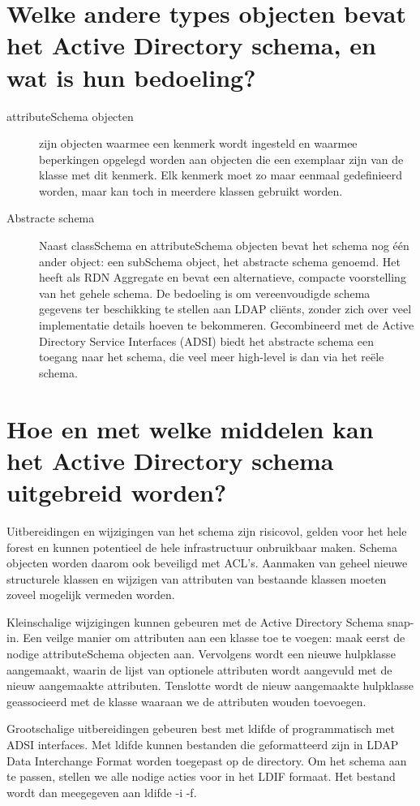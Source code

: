 \section{Welke andere types objecten bevat het Active Directory schema, en wat
is hun bedoeling?}

\begin{description}
	\item[attributeSchema objecten] zijn objecten waarmee een kenmerk wordt
		ingesteld en waarmee beperkingen opgelegd worden aan objecten
		die een exemplaar zijn van de klasse met dit kenmerk. Elk
		kenmerk moet zo maar eenmaal gedefinieerd worden, maar kan toch
		in meerdere klassen gebruikt worden.
	\item[Abstracte schema] Naast classSchema en attributeSchema
		objecten bevat het schema nog één ander object: een subSchema
		object, het abstracte schema genoemd. Het heeft als RDN
		Aggregate en bevat een alternatieve, compacte voorstelling van
		het gehele schema. De bedoeling is om vereenvoudigde schema
		gegevens ter beschikking te stellen aan LDAP cliënts, zonder
		zich over veel implementatie details hoeven te bekommeren.
		Gecombineerd met de Active Directory Service Interfaces (ADSI)
		biedt het abstracte schema een toegang naar het schema, die veel
		meer high-level is dan via het reële schema.
\end{description}

\section{Hoe en met welke middelen kan het Active Directory schema uitgebreid
worden?}

Uitbereidingen en wijzigingen van het schema zijn risicovol, gelden voor het
hele forest en kunnen potentieel de hele infrastructuur onbruikbaar maken.
Schema objecten worden daarom ook beveiligd met ACL's. Aanmaken van geheel
nieuwe structurele klassen en wijzigen van attributen van bestaande klassen
moeten zoveel mogelijk vermeden worden.

Kleinschalige wijzigingen kunnen gebeuren met de Active Directory Schema
snap-in. Een veilge manier om attributen aan een klasse toe te voegen: maak
eerst de nodige attributeSchema objecten aan. Vervolgens wordt een nieuwe
hulpklasse aangemaakt, waarin de lijst van optionele attributen wordt aangevuld
met de nieuw aangemaakte attributen. Tenslotte wordt de nieuw aangemaakte
hulpklasse geassocieerd met de klasse waaraan we de attributen wouden toevoegen.

Grootschalige uitbereidingen gebeuren best met ldifde of programmatisch met ADSI
interfaces. Met ldifde kunnen bestanden die geformatteerd zijn in LDAP Data
Interchange Format worden toegepast op de directory. Om het schema aan te
passen, stellen we alle nodige acties voor in het LDIF formaat. Het bestand
wordt dan meegegeven aan ldifde -i -f.
